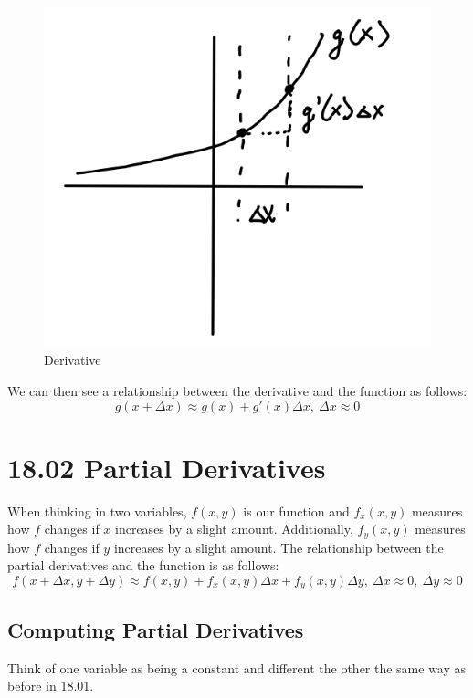 \documentclass{article}
\begin{document}
\begin{figure}[H]
  \centering
  \includegraphics[scale=0.50]{"Derivative"}
  \caption{Derivative}
\end{figure}

We can then see a relationship between the derivative and the function as
follows:
$$ g(x + \Delta x) \approx g(x) + g'(x) \Delta x,\ \Delta x \approx 0 $$

\section{ 18.02 Partial Derivatives }

When thinking in two variables, $ f(x, y) $ is our function and $ f_{x}(x, y) $
measures how $f$ changes if $x$ increases by a slight amount. Additionally, $
f_{y}(x, y) $ measures how $f$ changes if $y$ increases by a slight amount. The
relationship between the partial derivatives and the function is as follows:
$$ f(x + \Delta x, y + \Delta y) \approx f(x, y) + f_{x}(x, y) \Delta x +
f_{y}(x, y) \Delta y,\ \Delta x \approx 0,\ \Delta y \approx 0$$

\subsection{ Computing Partial Derivatives }

Think of one variable as being a constant and different the other the same way
as before in 18.01.
\end{document}

